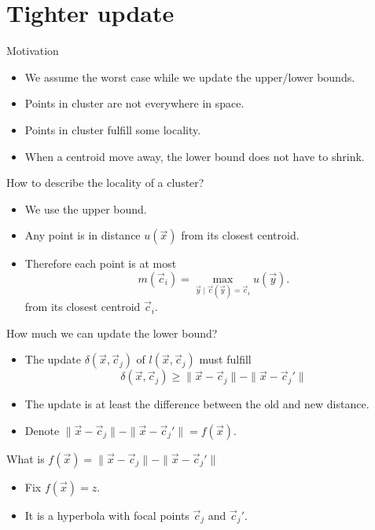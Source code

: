 \documentclass[10pt, compress]{beamer}
\newcommand{\x}{\vec{x}}
\newcommand{\cj}{\vec{c}_j}
\newcommand{\ci}{\vec{c}_i}
\newcommand{\ux}{u(\x)}
\newcommand{\lxcj}{l(\x, \cj)}
\newcommand{\distxcj}{\| \x - \cj \|}
\newcommand{\distxcjp}{\| \x - \cj' \|}
\newcommand{\deltaxcj}{\delta(\x, \cj)}
\newcommand{\mci}{m(\ci)}
\begin{document}

\section{Tighter update}

\begin{frame}{Motivation}
  \begin{itemize}
    \item We assume the worst case while we update the upper/lower bounds.
    \item Points in cluster are not everywhere in space.
    \item Points in cluster fulfill some locality.
    \item When a centroid move away, the lower bound does not have to shrink.
  \end{itemize}
\end{frame}

\begin{frame}{How to describe the locality of a cluster?}
  \begin{itemize}
    \item We use the upper bound.
    \item Any point is in distance $\ux$ from its closest centroid.
    \item Therefore each point is at most
      \begin{equation*}
         \mci = \max_{\vec{y} \mid \vec{c}(\vec{y}) = \ci} u(\vec{y}).
      \end{equation*}
      from its closest centroid $\ci$.
  \end{itemize}
\end{frame}

\begin{frame}{How much we can update the lower bound?}
  \begin{itemize}
     \item The update $\deltaxcj$ of $\lxcj$ must fulfill
       \begin{equation*}
         \deltaxcj \geq \distxcj - \distxcjp
       \end{equation*}
     \item The update is at least the difference between the old and new distance.
     \item Denote $\distxcj - \distxcjp = f(\x)$.
  \end{itemize}
\end{frame}

\begin{frame}{What is $f(\x) = \distxcj - \distxcjp$}
  \begin{itemize}
    \item Fix $f(\x) = z$.
    \item It is a hyperbola with focal points $\cj$ and $\cj'$.
  \end{itemize}
  \begin{center}
    
  \end{center}
\end{frame}
\end{document}
